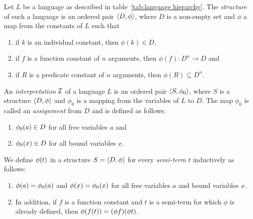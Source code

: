 \documentclass[11pt,a4paper]{article}
\begin{document}
\begin{definition}\label{def:structure of language}
    Let \(L\) be a language as described in table~\ref{tab:language hierarchy}.
    The \emph{structure} of such a language is an ordered pair \(\langle D,\phi\rangle\),
    where \(D\) is a non-empty set and \(\phi\) a map from the constants of \(L\)
    such that
    \begin{enumerate}
        \item
            if \(k\) is an individual constant, then \(\phi(k)\in D\),
        \item
            if \(f\) is a function constant of \(n\) arguments,
            then \(\phi(f): D^n\to D\) and
        \item
            if \(R\) is a predicate constant of \(n\) arguments,
            then \(\phi(R)\subseteq D^n\).
    \end{enumerate}
\end{definition}

\begin{definition}\label{def:interpretation of language}
    An \emph{interpretation} \(\mathcal{I}\) of a language \(L\) is an ordered pair \(\langle S,\phi_0\rangle\),
    where \(S\) is a structure \(\langle D,\phi\rangle\) and \(\phi_0\)
    is a mapping from the variables of \(L\) to \(D\).
    The map \(\phi_0\) is called an \emph{assignment} from \(D\)
    and is defined as follows:
    \begin{enumerate}
        \item
            \(\phi_0(a)\in D\) for all free variables \(a\) and
        \item
            \(\phi_0(x)\in D\) for all bound variables \(x\).
    \end{enumerate}
\end{definition}

\begin{definition}\label{def:extension of structure map}
    We define \(\phi(t)\) in a structure \(S = \langle D,\phi\rangle\)
    for every \emph{semi-term} \(t\) inductively
    as follows:
    \begin{enumerate}
    \item
        \(\phi(a) = \phi_0(a)\) and \(\phi(x) = \phi_0(x)\)
        for all free variables \(a\) and bound variables \(x\).
    \item
        In addition,
        if \(f\) is a function constant and \(t\) is a semi-term for which \(\phi\)
        is already defined, then \(\phi(f(t)) = (\phi f)(\phi t)\).
    \end{enumerate}
\end{definition}
\end{document}
